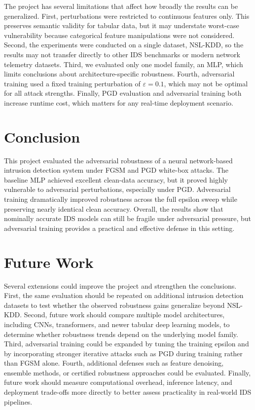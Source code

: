 \documentclass[11pt]{article}
\begin{document}
The project has several limitations that affect how broadly the results can be generalized. First, perturbations were restricted to continuous features only. This preserves semantic validity for tabular data, but it may understate worst-case vulnerability because categorical feature manipulations were not considered. Second, the experiments were conducted on a single dataset, NSL-KDD, so the results may not transfer directly to other IDS benchmarks or modern network telemetry datasets. Third, we evaluated only one model family, an MLP, which limits conclusions about architecture-specific robustness. Fourth, adversarial training used a fixed training perturbation of $\varepsilon = 0.1$, which may not be optimal for all attack strengths. Finally, PGD evaluation and adversarial training both increase runtime cost, which matters for any real-time deployment scenario.

\section{Conclusion}

This project evaluated the adversarial robustness of a neural network-based intrusion detection system under FGSM and PGD white-box attacks. The baseline MLP achieved excellent clean-data accuracy, but it proved highly vulnerable to adversarial perturbations, especially under PGD. Adversarial training dramatically improved robustness across the full epsilon sweep while preserving nearly identical clean accuracy. Overall, the results show that nominally accurate IDS models can still be fragile under adversarial pressure, but adversarial training provides a practical and effective defense in this setting.

\section{Future Work}

Several extensions could improve the project and strengthen the conclusions. First, the same evaluation should be repeated on additional intrusion detection datasets to test whether the observed robustness gains generalize beyond NSL-KDD. Second, future work should compare multiple model architectures, including CNNs, transformers, and newer tabular deep learning models, to determine whether robustness trends depend on the underlying model family. Third, adversarial training could be expanded by tuning the training epsilon and by incorporating stronger iterative attacks such as PGD during training rather than FGSM alone. Fourth, additional defenses such as feature denoising, ensemble methods, or certified robustness approaches could be evaluated. Finally, future work should measure computational overhead, inference latency, and deployment trade-offs more directly to better assess practicality in real-world IDS pipelines.
\end{document}
